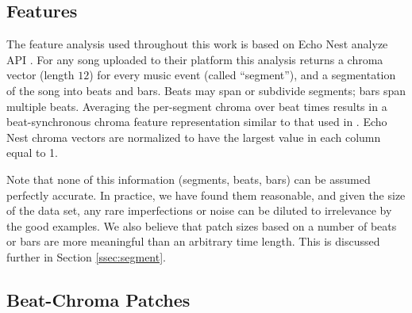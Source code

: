 \documentclass{article}
\newcommand{\eg}{e.g.~}
\begin{document}
\subsection{Features}
The feature analysis used throughout this work is based on Echo Nest
analyze API \cite{EchoNest}.  
%
For any song uploaded to their platform this analysis returns a chroma
vector (length $12$) for every music event (called ``segment''), and a
segmentation of the song into beats and bars. Beats may span or 
subdivide segments; bars span multiple beats.
%
Averaging the per-segment chroma over beat times results in a
beat-synchronous chroma feature representation similar to that used in
\cite{Ellis2007a}.  Echo Nest chroma vectors are normalized to have the 
largest value in each column equal to 1.


Note that none of this information (segments, beats, bars)
can be assumed perfectly accurate.
In practice, we have found them reasonable, 
and given the size of the data set, any rare imperfections or noise
can be diluted to irrelevance by the good examples.  
We also believe that patch sizes based on a number of beats or bars are more
meaningful than an arbitrary time length. This is discussed further in 
Section \ref{ssec:segment}.


\subsection{Beat-Chroma Patches} \label{ssec:beatpatch}
\end{document}
